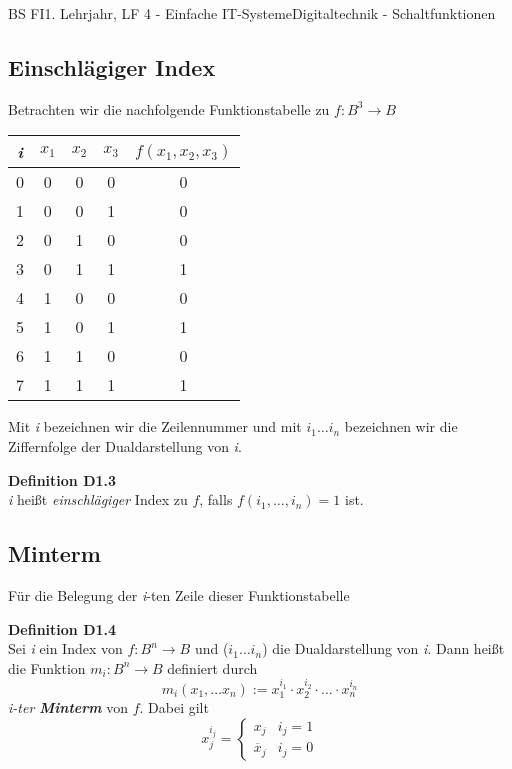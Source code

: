 \documentclass[11pt,twocolumn,oneside,openany,headings=optiontotoc,11pt,numbers=noenddot]{article}
\begin{document}
\begin{worksheet}{BS FI}{1. Lehrjahr, LF 4 - Einfache IT-Systeme}{Digitaltechnik - Schaltfunktionen}
		\subsection{Einschlägiger Index}
		Betrachten wir die nachfolgende Funktionstabelle zu \(f: B^3 \rightarrow B\)
		\begin{center}
			\begin{tabular}{|c|ccc|c|}
				\hline
				\textit{i} & \(x_1\) & \(x_2\) & \(x_3\) & \(f(x_1,x_2,x_3)\)\\
				\hline
				0 & 0 & 0 & 0 & 0\\
				\hline
				1 & 0 & 0 & 1 & 0\\
				\hline
				2 & 0 & 1 & 0 & 0\\
				\hline
				3 & 0 & 1 & 1 & 1\\
				\hline
				4 & 1 & 0 & 0 & 0\\
				\hline
				5 & 1 & 0 & 1 & 1\\
				\hline
				6 & 1 & 1 & 0 & 0\\
				\hline
				7 & 1 & 1 & 1 & 1\\
				\hline
			\end{tabular}
		\end{center}
		Mit \textit{i} bezeichnen wir die Zeilennummer und mit \(i_1 \ldots i_n\) bezeichnen wir die Ziffernfolge der Dualdarstellung von \textit{i}.
		\begin{framed}
			\textbf{Definition D1.3}\\ \textit{i} heißt \textit{einschlägiger} Index zu \(f\), falls \(f(i_1,\ldots,i_n) = 1\) ist.
		\end{framed}
		\subsection{Minterm}
		Für die Belegung der \textit{i}-ten Zeile dieser Funktionstabelle 
		\begin{framed}
			\textbf{Definition D1.4}\\ Sei \textit{i} ein Index von \(f: B^n \rightarrow B\) und (\(i_1\ldots i_n\)) die Dualdarstellung von \textit{i}. Dann heißt die Funktion \(m_i: B^n \rightarrow B\) definiert durch
			\[m_i(x_1,\ldots x_n) := x_{1}^{i_1}\cdot x_{2}^{i_2}\cdot\ldots\cdot x_{n}^{i_n}\]
			\textit{i-ter \textbf{Minterm}} von \(f\). Dabei gilt
			\[x_{j}^{i_j} = \begin{cases}x_j & i_j=1 \\ \overline x_j & i_j = 0\end{cases}\]
		\end{framed}

\end{worksheet}
\end{document}
